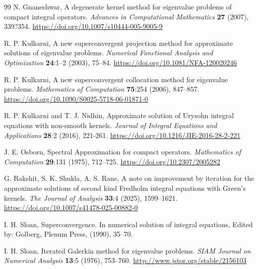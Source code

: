 \documentclass[pdflatex, sn-mathphys-num]{sn-jnl}%
\theoremstyle{thmstyleone}%
\theoremstyle{thmstyletwo}%
\theoremstyle{thmstylethree}%
\begin{document}
\begin{thebibliography}{99}
	N. Gnaneshwar, A degenerate kernel method for eigenvalue problems of compact integral operators. \textit{Advances in Computational Mathematics} \textbf{27} (2007), 339?354.
	\url{https://doi.org/10.1007/s10444-005-9005-9}
	
	
	R. P. Kulkarni, A new superconvergent projection method for approximate solutions of eigenvalue problems. \textit{Numerical Functional Analysis and Optimization} \textbf{24}:1--2 (2003), 75--84.
	\url{https://doi.org/10.1081/NFA-120020246}
	
	R. P. Kulkarni, A new superconvergent collocation method for eigenvalue problems. \textit{Mathematics of Computation} \textbf{75}:254 (2006), 847--857.
	\url{https://doi.org/10.1090/S0025-5718-06-01871-0}
	
	
	R. P. Kulkarni and T. J. Nidhin,  Approximate solution of Urysohn integral equations with non-smooth kernels. \textit{Journal of Integral Equations and Applications} \textbf{28}:2 (2016), 221-261. 
	\url{https://doi.org/10.1216/JIE-2016-28-2-221}
	
	
	J. E. Osborn, Spectral Approximation for compact operators. \textit{Mathematics of Computation} \textbf{29}:131 (1975), 712--725. 
	\url{https://doi.org/10.2307/2005282}
	
	G. Rakshit, S. K. Shukla, A. S.  Rane, A note on improvement by iteration for the approximate solutions of second kind Fredholm integral equations with Green's kernels. \textit{The Journal of Analysis} \textbf{33}:4 (2025), 1599--1621.
	\url{https://doi.org/10.1007/s41478-025-00882-0}
	
	I. H. Sloan, Superconvergence. In numerical solution of integral equations, Edited by: Golberg, Plenum Press, (1990), 35--70.
	
	I. H. Sloan, Iterated Galerkin method for eigenvalue problems. \textit{SIAM Journal on Numerical Analysis} \textbf{13}:5 (1976), 753--760.
	\url{http://www.jstor.org/stable/2156103}	
\end{thebibliography}
\end{document}
